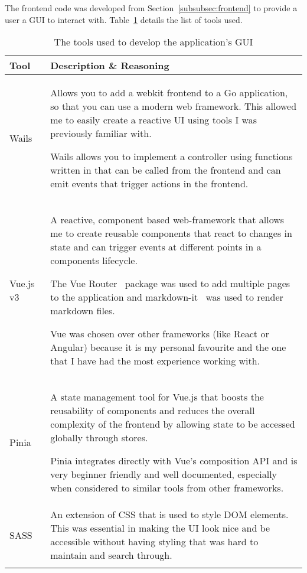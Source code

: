 The frontend code was developed from Section~\ref{subsubsec:frontend} to provide a user a GUI to interact with. Table~\ref{tab:tools-frontend} details the list of tools used.

\begin{longtable}{p{} p{}}
  \toprule
  \textbf{Tool} & \textbf{Description \& Reasoning}
  \\\midrule\midrule
  Wails~\cite{noauthor_wails_nodate}
  & \small Allows you to add a webkit frontend to a Go application, so that you can use a modern web framework. This allowed me to easily create a reactive UI using tools I was previously familiar with.

  Wails allows you to implement a controller using functions written in that can be called from the frontend and can emit events that trigger actions in the frontend.
  \\
  Vue.js v3~\cite{noauthor_vuejs_nodate}
  & \small A reactive, component based web-framework that allows me to create reusable components that react to changes in state and can trigger events at different points in a components lifecycle.
  
  The Vue Router~\cite{noauthor_vue_nodate} package was used to add multiple pages to the application and markdown-it~\cite{noauthor_markdown-it_2023} was used to render markdown files.

  Vue was chosen over other frameworks (like React or Angular) because it is my personal favourite and the one that I have had the most experience working with.
  \\
  Pinia~\cite{noauthor_pinia_nodate}
  & \small A state management tool for Vue.js that boosts the reusability of components and reduces the overall complexity of the frontend by allowing state to be accessed globally through stores.
  
  Pinia integrates directly with Vue's composition API and is very beginner friendly and well documented, especially when considered to similar tools from other frameworks.
  \\
  SASS~\cite{noauthor_sass_nodate}
  & \small An extension of CSS that is used to style DOM elements. This was essential in making the UI look nice and be accessible without having styling that was hard to maintain and search through.
  \\
  \bottomrule\bottomrule
  \caption{The tools used to develop the application's GUI }
  \label{tab:tools-frontend}
\end{longtable}

